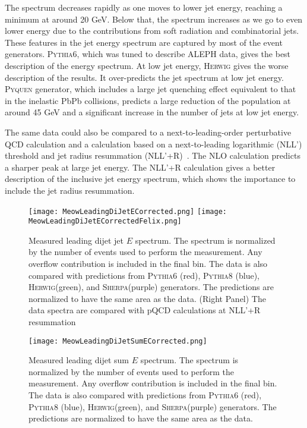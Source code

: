 \documentclass[aps,preprint,superscriptaddress,groupedaddress]{revtex4}  %
\newcommand{\sherpa}{\textsc{Sherpa}\xspace}
\newcommand{\herwig}{\textsc{Herwig}\xspace}
\newcommand{\pythia}[1]{\textsc{Pythia}{#1}\xspace}
\newcommand{\pyquen}{\textsc{Pyquen}\xspace}
\begin{document}
The spectrum decreases rapidly as one moves to lower jet energy, reaching a minimum at around 20 GeV. Below that, the spectrum increases as we go to even lower energy due to the contributions from soft radiation and combinatorial jets.
These features in the jet energy spectrum are captured by most of the event generators. \pythia{6}, which was tuned to describe ALEPH data, gives the best description of the energy spectrum. At low jet energy, \herwig gives the worse description of the results. It over-predicts the jet spectrum at low jet energy. \pyquen generator, which includes a large jet quenching effect equivalent to that in the inelastic PbPb collisions, predicts a large reduction of the population at around 45 GeV and a significant increase in the number of jets at low jet energy.

The same data could also be compared to a next-to-leading-order perturbative QCD calculation and a calculation based on a next-to-leading logarithmic (NLL’) threshold and jet radius resummation (NLL'+R)~\cite{Neill:2021std}. The NLO calculation predicts a sharper peak at large jet energy. The NLL'+R calculation gives a better description of the inclusive jet energy spectrum, which shows the importance to include the jet radius resummation.

\begin{figure}
    \centering
    \texttt{[image: MeowLeadingDiJetECorrected.png]}
    \texttt{[image: MeowLeadingDiJetECorrectedFelix.png]}
    \caption{Measured leading dijet jet $E$ spectrum.  The spectrum is normalized by the number of events used to perform the measurement.  Any overflow contribution is included in the final bin.  The data is also compared with predictions from \pythia{6} (red), \pythia{8} (blue), \herwig (green), and \sherpa (purple) generators.  The predictions are normalized to have the same area as the data.  (Right Panel) The data spectra are compared with pQCD calculations at NLL'+R resummation~\cite{Neill:2021std}}
    \label{Figure:UnfoldedJetLeadingDijetE}
\end{figure}

\begin{figure}
    \centering
    \texttt{[image: MeowLeadingDiJetSumECorrected.png]}
    \caption{Measured leading dijet sum $E$ spectrum.  The spectrum is normalized by the number of events used to perform the measurement.  Any overflow contribution is included in the final bin.  The data is also compared with predictions from \pythia{6} (red), \pythia{8} (blue), \herwig (green), and \sherpa (purple) generators.  The predictions are normalized to have the same area as the data.}
    \label{Figure:UnfoldedJetLeadingDijetESum}
\end{figure}
\end{document}
